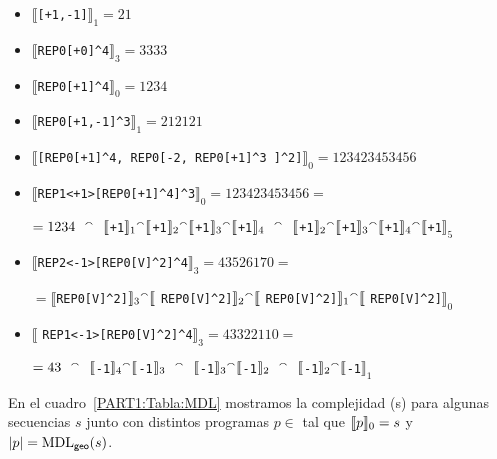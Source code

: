 \begin{itemize}
\item  $\llbracket$\verb#[+1,-1]#$\rrbracket_1 = 21$

\item  $\llbracket$\verb#REP0[+0]^4#$\rrbracket_3 = 3333$

\item  $\llbracket$\verb#REP0[+1]^4#$\rrbracket_0 = 1234$

\item  $\llbracket$\verb#REP0[+1,-1]^3#$\rrbracket_1 = 212121$

\item  $\llbracket$\verb#[REP0[+1]^4, REP0[-2, REP0[+1]^3 ]^2]#$\rrbracket_0 = 123423453456$

\item  $\llbracket$\verb#REP1<+1>[REP0[+1]^4]^3#$\rrbracket_0 = 123423453456=$

$= 1234 \ \ \concat \ \ \llbracket$\verb#+1#$\rrbracket_1 {}^\smallfrown \llbracket$\verb#+1#$\rrbracket_2 {}^\smallfrown \llbracket$\verb#+1#$\rrbracket_3 {}^\smallfrown \llbracket$\verb#+1#$\rrbracket_4 \ \ \concat \ \ \llbracket$\verb#+1#$\rrbracket_2 {}^\smallfrown \llbracket$\verb#+1#$\rrbracket_3 {}^\smallfrown \llbracket$\verb#+1#$\rrbracket_4 {}^\smallfrown \llbracket$\verb#+1#$\rrbracket_5$

\item  $\llbracket$\verb#REP2<-1>[REP0[V]^2]^4#$\rrbracket_3 = 43526170=$ 

$= \llbracket$\verb#REP0[V]^2]#$ \rrbracket_3 {}^\smallfrown \llbracket$ \verb#REP0[V]^2]#$ \rrbracket_2 {}^\smallfrown \llbracket$ \verb#REP0[V]^2]#$ \rrbracket_1 {}^\smallfrown \llbracket$ \verb#REP0[V]^2]#$ \rrbracket_0$

\item  $\llbracket$ \verb#REP1<-1>[REP0[V]^2]^4#$\rrbracket_3 = 43322110=$

$= 43 \ \ \concat \ \ \llbracket$\verb#-1#$\rrbracket_4 {}^\smallfrown \llbracket$\verb#-1#$\rrbracket_3 \ \ \concat \ \ \llbracket$\verb#-1#$\rrbracket_3 {}^\smallfrown \llbracket$\verb#-1#$\rrbracket_2 \ \ \concat \ \ \llbracket$\verb#-1#$\rrbracket_2 {}^\smallfrown \llbracket$\verb#-1#$\rrbracket_1 $

\end{itemize}
En el cuadro~\ref{PART1:Tabla:MDL} mostramos la complejidad \mdlgeo(s) para algunas secuencias $s$ junto con distintos programas $p \in$ \gramgeo tal que $\llbracket p\rrbracket_0=s$ y $|p|={\rm MDL}_{{\sf geo}}(s) $.


